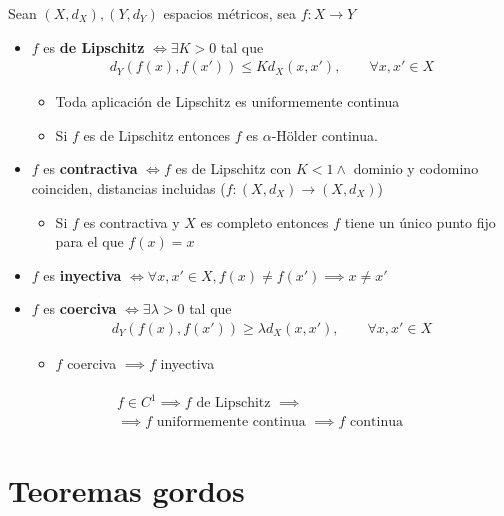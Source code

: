 \documentclass[a4paper,twocolumn]{extarticle}
\begin{document}
Sean $(X, d_X), (Y, d_Y)$ espacios métricos, sea $f:X \to Y$
\begin{itemize}
	\item $f$ es \textbf{de Lipschitz} $\iff \exists K > 0$ tal que
	\begin{align*}
		d_Y(f(x), f(x')) \leq K d_X(x,x'),\qquad \forall x,x' \in X
	\end{align*}
	\begin{itemize}
		\item Toda aplicación de Lipschitz es uniformemente continua
		\item Si $f$ es de Lipschitz entonces $f$ es $\alpha$-Hölder continua.
	\end{itemize}

	\item $f$ es \textbf{contractiva} $\iff f$ es de Lipschitz con $K < 1 \land$ dominio y codomino coinciden, distancias incluidas ($f:(X, d_X) \to (X, d_X)$)
	\begin{itemize}
		\item Si $f$ es contractiva y $X$ es completo entonces $f$ tiene un único punto fijo para el que $f(x) = x$
	\end{itemize}
	
	\item $f$ es \textbf{inyectiva} $\iff \forall x,x' \in X, f(x) \neq f(x') \implies x \neq x'$
	
	\item $f$ es \textbf{coerciva} $\iff \exists \lambda > 0$ tal que
	\begin{align*}
		d_Y(f(x), f(x')) \geq \lambda d_X(x,x'),\qquad \forall x,x' \in X
	\end{align*}
	\begin{itemize}
		\item $f$ coerciva $\implies f$ inyectiva
	\end{itemize}
\end{itemize}
\begin{multline}
\boxed{
	\begin{array}{c}
	f \in C^1 \implies f \text{ de Lipschitz }\implies\\
	\implies f \text{ uniformemente continua }\implies f\text{ continua}
	\end{array}
	}
\end{multline}

\section{Teoremas gordos}
\end{document}
